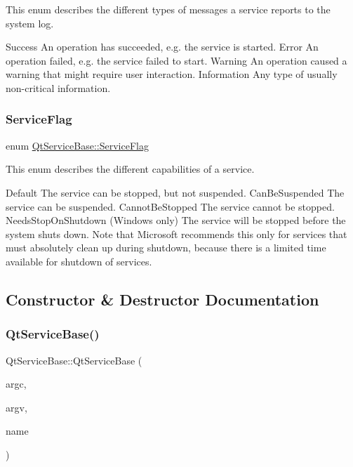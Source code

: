This enum describes the different types of messages a service reports to the system log.

Success An operation has succeeded, e.\+g. the service is started.  Error An operation failed, e.\+g. the service failed to start.  Warning An operation caused a warning that might require user interaction.  Information Any type of usually non-\/critical information. \mbox{\label{class_qt_service_base_af6e74a87329ef64760783364538e5d51}} 
\subsubsection{\texorpdfstring{Service\+Flag}{ServiceFlag}}
{\footnotesize\ttfamily enum \hyperlink{class_qt_service_base_af6e74a87329ef64760783364538e5d51}{Qt\+Service\+Base\+::\+Service\+Flag}}

This enum describes the different capabilities of a service.

Default The service can be stopped, but not suspended.  Can\+Be\+Suspended The service can be suspended.  Cannot\+Be\+Stopped The service cannot be stopped.  Needs\+Stop\+On\+Shutdown (Windows only) The service will be stopped before the system shuts down. Note that Microsoft recommends this only for services that must absolutely clean up during shutdown, because there is a limited time available for shutdown of services. 

\subsection{Constructor \& Destructor Documentation}
\mbox{\label{class_qt_service_base_a75e3f82739df6dc0b9aa899b3f9552eb}} 
\subsubsection{\texorpdfstring{Qt\+Service\+Base()}{QtServiceBase()}}
{\footnotesize\ttfamily Qt\+Service\+Base\+::\+Qt\+Service\+Base (\begin{DoxyParamCaption}\item[{int}]{argc,  }\item[{char $\ast$$\ast$}]{argv,  }\item[{const Q\+String \&}]{name }\end{DoxyParamCaption})}

